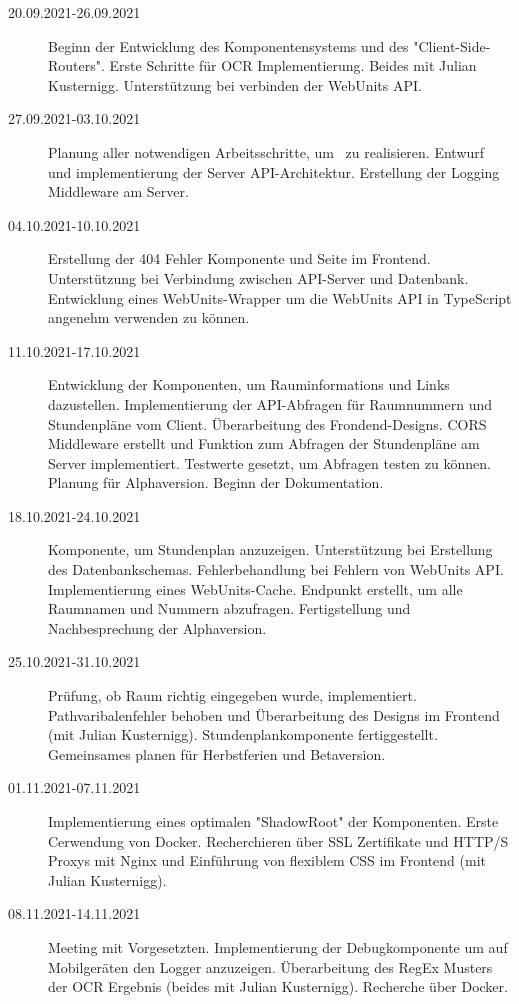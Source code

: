 
\begin{description}
    \item[20.09.2021-26.09.2021] Beginn der Entwicklung des Komponentensystems und des "Client-Side-Routers". Erste Schritte für OCR Implementierung. Beides mit Julian Kusternigg. Unterstützung bei verbinden der WebUnits API.
    \item[27.09.2021-03.10.2021] Planung aller notwendigen Arbeitsschritte, um \ZELIA\ zu realisieren. Entwurf und implementierung der Server API-Architektur. Erstellung der Logging Middleware am Server.
    \item[04.10.2021-10.10.2021] Erstellung der 404 Fehler Komponente und Seite im Frontend. Unterstützung bei Verbindung zwischen API-Server und Datenbank. Entwicklung eines WebUnits-Wrapper um die WebUnits API in TypeScript angenehm verwenden zu können.
    \item[11.10.2021-17.10.2021] Entwicklung der Komponenten, um Rauminformations und Links dazustellen. Implementierung der API-Abfragen für Raumnummern und Stundenpläne vom Client. Überarbeitung des Frondend-Designs. CORS Middleware erstellt und Funktion zum Abfragen der Stundenpläne am Server implementiert. Testwerte gesetzt, um Abfragen testen zu können. Planung für Alphaversion. Beginn der Dokumentation. 
    \item[18.10.2021-24.10.2021] Komponente, um Stundenplan anzuzeigen. Unterstützung bei Erstellung des Datenbankschemas. Fehlerbehandlung bei Fehlern von WebUnits API. Implementierung eines WebUnits-Cache. Endpunkt erstellt, um alle Raumnamen und Nummern abzufragen. Fertigstellung und Nachbesprechung der Alphaversion.
    \item[25.10.2021-31.10.2021] Prüfung, ob Raum richtig eingegeben wurde, implementiert. Pathvaribalenfehler behoben und Überarbeitung des Designs im Frontend (mit Julian Kusternigg). Stundenplankomponente fertiggestellt. Gemeinsames planen für Herbstferien und Betaversion. 
    \item[01.11.2021-07.11.2021] Implementierung eines optimalen "ShadowRoot" der Komponenten. Erste Cerwendung von Docker. Recherchieren über SSL Zertifikate und HTTP/S Proxys mit Nginx und Einführung von flexiblem CSS im Frontend (mit Julian Kusternigg).
    \item[08.11.2021-14.11.2021] Meeting mit Vorgesetzten. Implementierung der Debugkomponente um auf Mobilgeräten den Logger anzuzeigen. Überarbeitung des RegEx Musters der OCR Ergebnis (beides mit Julian Kusternigg). Recherche über Docker.

\end{description}
